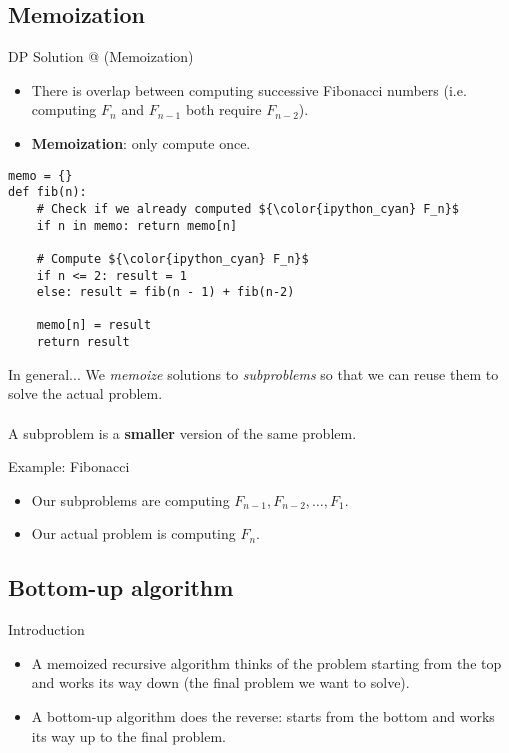 \documentclass{beamer}
\makeatletter
\newcommand*{\rom}[1]{\expandafter\@slowromancap\romannumeral #1@}
\makeatother
\begin{document}
\subsection{Memoization}
\begin{frame}[fragile]{DP Solution \rom{1} (Memoization)}
    \begin{itemize}
        \item There is overlap between computing successive Fibonacci numbers (i.e. computing $F_n$ and $F_{n-1}$ both require $F_{n-2}$).
        \item \textbf{Memoization}: only compute once.
    \end{itemize}

\begin{center}
\begin{lstlisting}[language=iPython, mathescape=true]
memo = {}
def fib(n):
    # Check if we already computed ${\color{ipython_cyan} F_n}$
    if n in memo: return memo[n]
    
    # Compute ${\color{ipython_cyan} F_n}$
    if n <= 2: result = 1
    else: result = fib(n - 1) + fib(n-2)
    
    memo[n] = result
    return result
\end{lstlisting}
\end{center}
\end{frame}

\begin{frame}{In general...}
    We \textit{memoize} solutions to \textit{subproblems} so that we can reuse them to solve the actual problem.\\~\\
    A subproblem is a \textbf{smaller} version of the same problem.
    \begin{block}{Example: Fibonacci}
        \begin{itemize}
            \item Our subproblems are computing $F_{n-1},F_{n-2},\ldots,F_1$.
            \item Our actual problem is computing $F_n$.
        \end{itemize}
    \end{block}
\end{frame}

\subsection{Bottom-up algorithm}
\begin{frame}{Introduction}
    \begin{itemize}
        \item A memoized recursive algorithm thinks of the problem starting from the top and works its way down (the final problem we want to solve).
        \item A bottom-up algorithm does the reverse: starts from the bottom and works its way up to the final problem.
    \end{itemize}
\end{frame}
\end{document}
